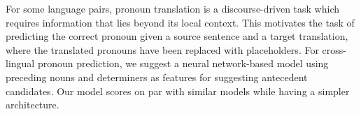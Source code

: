 For some language pairs, pronoun translation is a discourse-driven task which requires information that lies beyond its local context. This motivates the task of predicting the correct pronoun given a source sentence and a target translation, where the translated pronouns have been replaced with placeholders. For cross-lingual pronoun prediction, we suggest a neural network-based model using preceding nouns and determiners as features for suggesting antecedent candidates. Our model scores on par with similar models while having a simpler architecture.
